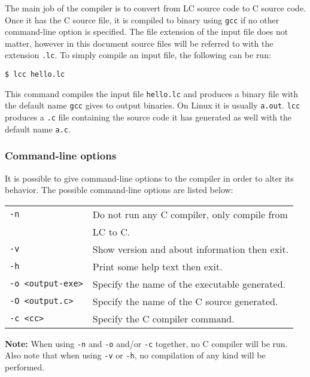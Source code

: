\documentclass[12pt]{article}
\begin{document}
The main job of the compiler is to convert from LC source code to C source code.
Once it has the C source file, it is compiled to binary using \texttt{gcc} if no
other command-line option is specified. The file extension of the input file
does not matter, however in this document source files will be referred to with
the extension \texttt{.lc}. To simply compile an input file, the following can
be run:
\begin{lstlisting}
$ lcc hello.lc
\end{lstlisting}
This command compiles the input file \texttt{hello.lc} and produces a binary
file with the default name \texttt{gcc} gives to output binaries. On Linux it is
usually \texttt{a.out}. \texttt{lcc} produces a \texttt{.c} file containing the
source code it has generated as well with the default name \texttt{a.c}.

\subsubsection{Command-line options} \label{command-line-options}

It is possible to give command-line options to the compiler in order to alter
its behavior. The possible command-line options are listed below:

\vspace{7pt}

\begin{tabular}{l l}
    \texttt{-n}\quad& Do not run any C compiler, only compile from \\ 
                    & LC to C. \\
    \texttt{-v}\quad& Show version and about information then exit. \\
    \texttt{-h}\quad& Print some help text then exit. \\
    \texttt{-o <output-exe>}\quad& Specify the name of the executable
        generated. \\
    \texttt{-O <output.c>}\quad& Specify the name of the C source generated. \\
    \texttt{-c <cc>}\quad& Specify the C compiler command.
\end{tabular}

\vspace{8pt}

\textbf{Note:} When using \texttt{-n} and \texttt{-o} and/or \texttt{-c} together,
no C compiler will be run. Also note that when using \texttt{-v} or \texttt{-h},
no compilation of any kind will be performed. 
\end{document}
